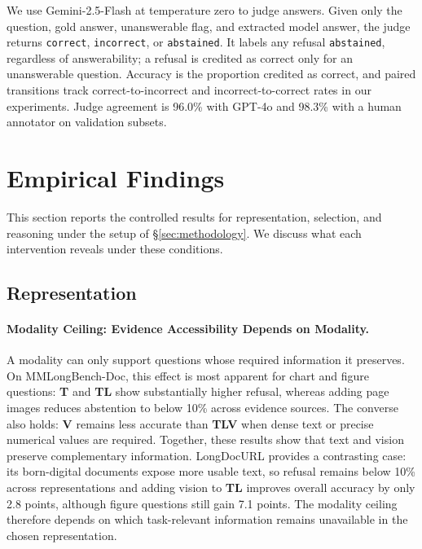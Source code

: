 \documentclass[11pt]{article}
\begin{document}
We use Gemini-2.5-Flash at temperature zero to judge answers. Given only the question, gold answer, unanswerable flag, and extracted model answer, the judge returns \texttt{correct}, \texttt{incorrect}, or \texttt{abstained}. It labels any refusal \texttt{abstained}, regardless of answerability; a refusal is credited as correct only for an unanswerable question. Accuracy is the proportion credited as correct, and paired transitions track correct-to-incorrect and incorrect-to-correct rates in our experiments. Judge agreement is 96.0\% with GPT-4o and 98.3\% with a human annotator on validation subsets.

\section{Empirical Findings}
\label{sec:findings}

This section reports the controlled results for representation, selection, and reasoning under the setup of \S\ref{sec:methodology}. We discuss what each intervention reveals under these conditions.

\subsection{Representation}
\label{sec:findings_representation}



\paragraph{Modality Ceiling: Evidence Accessibility Depends on Modality.}
A modality can only support questions whose required information it preserves. On MMLongBench-Doc, this effect is most apparent for chart and figure questions: \textbf{T} and \textbf{TL} show substantially higher refusal, whereas adding page images reduces abstention to below 10\% across evidence sources. The converse also holds: \textbf{V} remains less accurate than \textbf{TLV} when dense text or precise numerical values are required. Together, these results show that text and vision preserve complementary information. LongDocURL provides a contrasting case: its born-digital documents expose more usable text, so refusal remains below 10\% across representations and adding vision to \textbf{TL} improves overall accuracy by only 2.8 points, although figure questions still gain 7.1 points. The modality ceiling therefore depends on which task-relevant information remains unavailable in the chosen representation.
\end{document}
